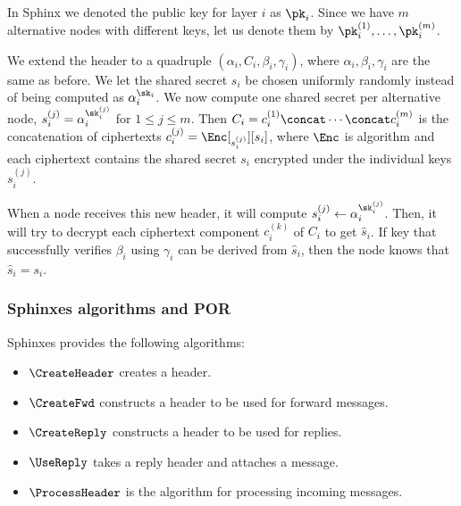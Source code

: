 In Sphinx we denoted the public key for layer \(i\) as \(\pk_i\).
Since we have \(m\) alternative nodes with different keys, let us denote them 
by \(\pk_i^{(1)}, \dotsc, \pk_i^{(m)}\).

We extend the header to a quadruple \((\alpha_i, C_i, \beta_i, \gamma_i)\), 
where \(\alpha_i, \beta_i, \gamma_i\) are the same as before.
We let the shared secret \(s_i\) be chosen uniformly randomly instead of being 
computed as \(\alpha_i^{\sk_i}\).
We now compute one shared secret per alternative node, \ie \(s_i^{(j)} = 
  \alpha_i^{\sk_i^{(j)}}\) for \(1\leq j\leq m\).
Then \(C_i = c_i^{(1)}\concat \dotsb\concat c_i^{(m)}\) is the concatenation of 
ciphertexts \(c_i^{(j)} = \Enc[_{s_i^{(j)}}][s_i]\), where \(\Enc\) is 
 algorithm and each ciphertext contains the shared secret \(s_i\) 
encrypted under the individual keys \(s_i^{(j)}\). 

When a node receives this new header, it will compute \(s_i^{(j)}\gets 
  \alpha_i^{\sk_i^{(j)}}\).
Then, it will try to decrypt each ciphertext component \(c_i^{(k)}\) of \(C_i\) 
to get \(\hat s_i\).
If  key that successfully verifies \(\beta_i\) using \(\gamma_i\) can 
be derived from \(\hat s_i\), then the node knows that \(\hat s_i = s_i\).


\subsubsection{Sphinxes algorithms and \acf*{POR}}

Sphinxes provides the following algorithms:
\begin{itemize}
  \item \(\CreateHeader\) creates a header.

  \item \(\CreateFwd\) constructs a header to be used for forward messages.

  \item \(\CreateReply\) constructs a header to be used for replies.

  \item \(\UseReply\) takes a reply header and attaches a message.

  \item \(\ProcessHeader\) is the algorithm for processing incoming messages.
\end{itemize}

